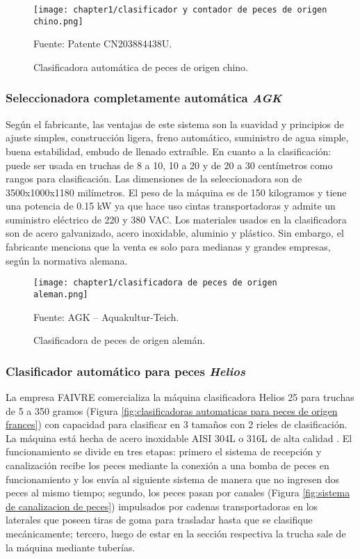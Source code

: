 \begin{figure}[H]
	\centering
	\texttt{[image: chapter1/clasificador y contador de peces de origen chino.png]}
	\caption{Clasificadora automática de peces de origen chino.}
	Fuente: Patente CN203884438U.
	\label{fig:clasificador y contador de peces de origen chino}
\end{figure}

\subsubsection{Seleccionadora completamente automática \textit{AGK}}

Según el fabricante, las ventajas de este sistema son la suavidad y principios de ajuste simples, construcción ligera, freno automático, suministro de agua simple, buena estabilidad, embudo de llenado extraíble. En cuanto a la clasificación: puede ser usada en truchas de 8 a 10, 10 a 20 y de 20 a 30 centímetros como rangos para clasificación. Las dimensiones de la seleccionadora son de 3500x1000x1180 milímetros. El peso de la máquina es de 150 kilogramos y tiene una potencia de 0.15 kW ya que hace uso cintas transportadoras y admite un suministro eléctrico de 220 y 380 VAC. Los materiales usados en la clasificadora son de acero galvanizado, acero inoxidable, aluminio y plástico.\cite{AGKAquakultur-Teich2010} Sin embargo, el fabricante menciona que la venta es solo para medianas y grandes empresas, según la normativa alemana.

\begin{figure}[H]
	\centering
	\texttt{[image: chapter1/clasificadora de peces de origen aleman.png]}
	\caption{Clasificadora de peces de origen alemán.}
	Fuente: AGK – Aquakultur-Teich.
	\label{fig:clasificadora de peces de origen aleman}
\end{figure}

\subsubsection{Clasificador automático para peces \textit{Helios}}
\label{sssec:clasificador automatico para peces helios}

La empresa FAIVRE comercializa la máquina clasificadora Helios 25 para truchas de 5 a 350 gramos (Figura \ref{fig:clasificadoras automaticas para peces de origen frances}) con capacidad para clasificar en 3 tamaños con 2 rieles de clasificación. La máquina está hecha de acero inoxidable AISI 304L o 316L de alta calidad \cite[p.~1]{FAIVRE2019a}. El funcionamiento se divide en tres etapas: primero el sistema de recepción y canalización recibe los peces mediante la conexión a una bomba de peces en funcionamiento y los envía al siguiente sistema de manera que no ingresen dos peces al mismo tiempo; segundo, los peces pasan por canales (Figura \ref{fig:sistema de canalizacion de peces}) impulsados por cadenas transportadoras en los laterales que poseen tiras de goma para trasladar hasta que se clasifique mecánicamente; tercero, luego de estar en la sección respectiva la trucha sale de la máquina mediante tuberías.

